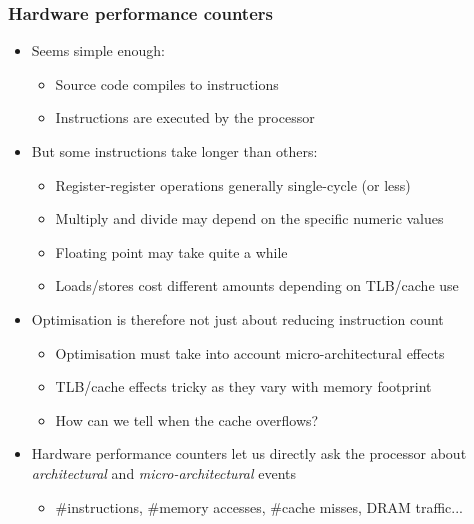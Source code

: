 \begin{frame}
  \frametitle{Hardware performance counters}

  \begin{itemize}
    \item Seems simple enough:
    \begin{itemize}
      \item Source code compiles to instructions
      \item Instructions are executed by the processor
    \end{itemize}

    \pause
    \bigskip

    \item But some instructions take longer than others:
    \begin{itemize}
      \item Register-register operations generally single-cycle (or less)
      \item Multiply and divide may depend on the specific numeric values
      \item Floating point may take quite a while
      \item Loads/stores cost different amounts depending on TLB/cache use
    \end{itemize}

    \pause
    \bigskip

    \item Optimisation is therefore not just about reducing instruction count
    \begin{itemize}
      \item Optimisation must take into account micro-architectural effects
      \item TLB/cache effects tricky as they vary with memory footprint
      \item How can we tell when the cache overflows?
    \end{itemize}

    \pause
    \bigskip

    \item Hardware performance counters let us directly ask the processor
      about \textit{architectural} and \textit{micro-architectural} events
    \begin{itemize}
      \item \#instructions, \#memory accesses, \#cache misses, DRAM traffic...
    \end{itemize}
  \end{itemize}
\end{frame}

